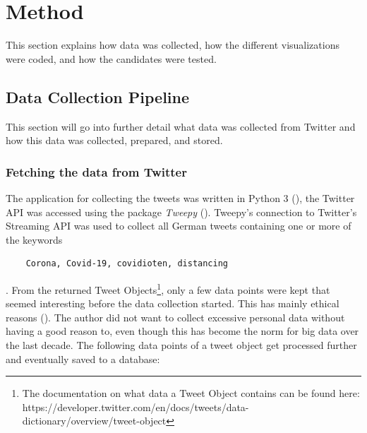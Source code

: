 \section{Method}
This section explains how data was collected, how the different visualizations were coded, and how the candidates were tested.

\subsection{Data Collection Pipeline}
This section will go into further detail what data was collected from Twitter and how this data was collected, prepared, and stored.

\subsubsection{Fetching the data from Twitter} \label{sec:fetchedData}
The application for collecting the tweets was written in Python 3 (\cite{10.5555/1593511}), the Twitter API was accessed using the package \emph{Tweepy} (\cite{roesslein2020tweepy}). Tweepy's connection to Twitter's Streaming API was used to collect all German tweets containing one or more of the keywords
\begin{verbatim}
    Corona, Covid-19, covidioten, distancing
\end{verbatim}. From the returned Tweet Objects\footnote{The documentation on what data a Tweet Object contains can be found here: https://developer.twitter.com/en/docs/tweets/data-dictionary/overview/tweet-object}, only a few data points were kept that seemed interesting before the data collection started. This has mainly ethical reasons (\cite{richards2014big}). The author did not want to collect excessive personal data without having a good reason to, even though this has become the norm for big data over the last decade. The following data points of a tweet object get processed further and eventually saved to a database:

